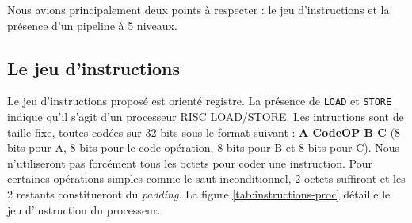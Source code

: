Nous avions principalement deux points à respecter : le jeu d'instructions et la présence d'un pipeline à 5 niveaux.

\subsection{Le jeu d’instructions}

Le jeu d'instructions proposé est orienté registre. La présence de \texttt{LOAD} et \texttt{STORE} indique qu'il s'agit d'un processeur RISC LOAD/STORE. Les intructions sont de taille fixe, toutes codées sur 32 bits sous le format suivant : \textbf{A  CodeOP  B  C} (8 bits pour A, 8 bits pour le code opération, 8 bits pour B et 8 bits pour C). Nous n'utiliseront pas forcément tous les octets pour coder une instruction. Pour certaines opérations simples comme le saut inconditionnel, 2 octets suffiront et les 2 restants constitueront du \textit{padding}. La figure \ref{tab:instructions-proc} détaille le jeu d'instruction du processeur.

